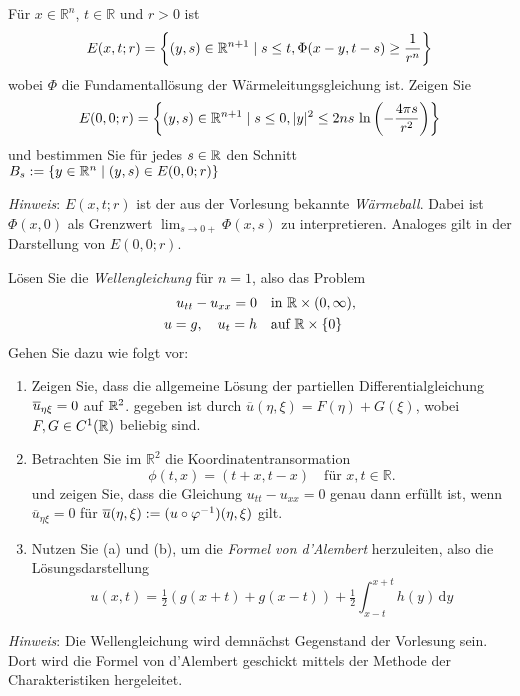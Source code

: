 \begin{exercisePage}
	\setcounter{taskcount}{17}
	
	\begin{task}
		Für $x\in\mathbb R^n$, $t\in \mathbb R$ und $r>0$ ist
		\begin{equation*}
			E(x,t;r) = \left\{(y,s)\in \mathbb{R}^{n+1}\mid s\leq t, \Phi(x-y,t-s)\geq \frac{1}{r^n}\right\}
		\end{equation*}
		wobei $\Phi$ die Fundamentallösung der Wärmeleitungsgleichung ist.
		Zeigen Sie
		\begin{equation*}
			E(0,0;r) =\left\{ (y,s)\in \mathbb{R}^{n+1}\mid s\leq 0, |y|^2\leq 2n s\ {\ln}\left(-\frac{4\pi s}{r^2}\right)\right\}
		\end{equation*}
		und bestimmen Sie für jedes $s\in \mathbb{R}$ den Schnitt $B_s := \{y\in \mathbb{R}^n \mid (y,s)\in E(0,0;r)\}$
		
		\textit{Hinweis}: $E(x,t;r)$ ist der aus der Vorlesung bekannte \textit{Wärmeball}. Dabei ist $\Phi(x,0)$ als Grenzwert $\lim_{ s\to 0+} \Phi(x,s)$ zu interpretieren. Analoges gilt in der Darstellung von $E(0,0;r)$.
	\end{task}
	
	\begin{task}
		Lösen Sie die \textit{Wellengleichung} für $n=1$, also das Problem
		\begin{align*}
			u_{tt} - u_{xx} = 0\quad&\text{in } \mathbb{R} \times(0,\infty),\\
			u = g,\quad u_t = h\quad&\text{auf } \mathbb{R} \times \{0\}
		\end{align*}
		Gehen Sie dazu wie folgt vor:
		\begin{enumerate}
			\item Zeigen Sie, dass die allgemeine Lösung der partiellen Differentialgleichung $\overline{u}_{\eta\xi} = 0$ auf $\mathbb{R}^2$.
			gegeben ist durch $\overline{u}(\eta,\xi) = F(\eta) + G(\xi)$, wobei $F,G \in C^1(\mathbb{R})$ beliebig sind.
			\item 
			Betrachten Sie im $\mathbb{R}^2$ die Koordinatentransormation
			\begin{equation*}
				\phi(t,x) = (t + x,t - x)\quad \text{für } x,t\in \mathbb{R}.
			\end{equation*}
			und zeigen Sie, dass die Gleichung $u_{tt} - u_{xx} = 0$ genau dann erfüllt ist, wenn $\overline{u}_{\eta\xi} = 0$ für
			$\overline{u}(\eta, \xi) := (u \circ \varphi^{-1})(\eta,\xi)$ gilt.
			\item 
			Nutzen Sie (a) und (b), um die \textit{Formel von d'Alembert} herzuleiten, also die Lösungs\-darstellung
			\begin{equation*}
				u(x,t) = \tfrac12\left(g(x+t)+g(x-t)\right) + \tfrac1{2} \int_{x-t}^{x+t} h(y)\,\mathrm{d}y
			\end{equation*}
		\end{enumerate}
		\textit{Hinweis}: Die Wellengleichung wird demnächst Gegenstand der Vorlesung sein. Dort wird die Formel von d'Alembert geschickt mittels der Methode der Charakteristiken hergeleitet.
	\end{task}

\end{exercisePage}